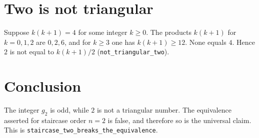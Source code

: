 \documentclass[11pt]{article}
\begin{document}
\section{Two is not triangular}
Suppose \(k(k+1)=4\) for some integer \(k\ge 0\). The products \(k(k+1)\) for \(k=0,1,2\) are \(0,2,6\), and for \(k\ge 3\) one has \(k(k+1)\ge 12\). None equals \(4\). Hence \(2\) is not equal to \(k(k+1)/2\) (\texttt{not\_triangular\_two}).

\section{Conclusion}
The integer \(g_2\) is odd, while \(2\) is not a triangular number. The equivalence asserted for staircase order \(n=2\) is false, and therefore so is the universal claim. This is \texttt{staircase\_two\_breaks\_the\_equivalence}.
\end{document}
